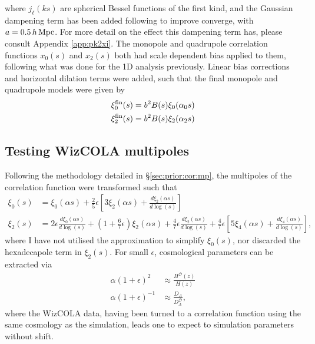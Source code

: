 \documentclass[titlesmallcaps, examinerscopy, copyrightpage]{uqthesis}
\begin{document}
where $j_\ell(ks)$ are spherical Bessel functions of the first kind, and the Gaussian dampening term has been added following \citet{AndersonAubourg2012} to improve converge, with $a= 0.5\, h\, \rm{Mpc}$. For more detail on the effect this dampening term has, please consult Appendix \ref{app:pk2xi}. The monopole and quadrupole correlation functions $x_0(s)$ and $x_2(s)$ both had scale dependent bias applied to them, following what was done for the 1D analysis previously. Linear bias corrections and horizontal dilation terms were added, such that the final monopole and quadrupole models were given by
\begin{align}
\xi_0^{\rm{fin}}(s) &= b^2 B(s) \xi_0(\alpha_0 s) \\
\xi_2^{\rm{fin}}(s) &= b^2 B(s) \xi_2(\alpha_2 s)
\end{align}



\subsection{Testing WizCOLA multipoles}

Following the methodology detailed in \S\ref{sec:prior:cor:mp}, the multipoles of the correlation function were transformed such that
\begin{align}
\xi_0(s) &= \xi_0(\alpha s) + \frac{2}{5}\epsilon \left[ 3 \xi_2(\alpha s) + \frac{d \xi_2(\alpha s)}{d \log(s)}\right] \\
\xi_2(s) &= 2\epsilon \frac{d \xi_0(\alpha s)}{d\log(s)} + \left( 1 + \frac{6}{7}\epsilon\right) \xi_2(\alpha s) + \frac{4}{7} \epsilon \frac{d \xi_2(\alpha s)}{d \log(s)} + \frac{4}{7}\epsilon \left[ 5 \xi_4 (\alpha s) + \frac{d \xi_4(\alpha s)}{d \log(s)} \right] ,
\end{align}
where I have not utilised the approximation to simplify $\xi_0(s)$, nor discarded the hexadecapole term in $\xi_2(s)$. For small $\epsilon$, cosmological parameters can be extracted via
\begin{align}
\alpha(1 + \epsilon)^2 &\approx \frac{H^\mathcal{D}(z)}{H(z)} \\
\alpha(1 + \epsilon)^{-1} &\approx \frac{D_A}{D_A^\mathcal{D}},
\end{align}
where the WizCOLA data, having been turned to a correlation function using the same cosmology as the simulation, leads one to expect to simulation parameters without shift. 
\end{document}
